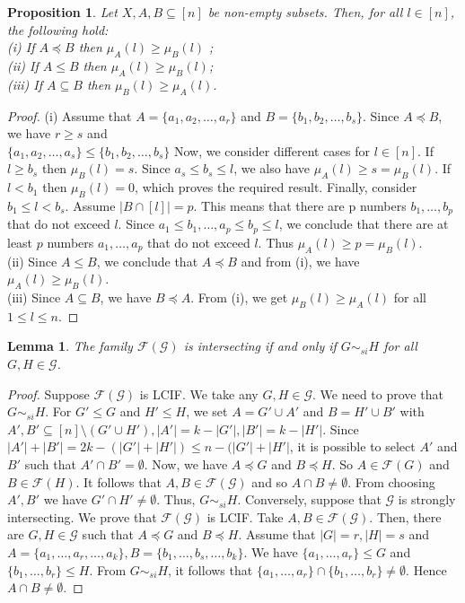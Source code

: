 \documentclass[reqno,english]{amsart}
\theoremstyle{plain}
\newtheorem{lem}[theorem]{Lemma}
\newtheorem{prop}[theorem]{Proposition}
\theoremstyle{remark}
\newcommand{\0}[0]{\emptyset}
\renewcommand{\1}[0]{\textbf{1}}
\theoremstyle{plain}
\theoremstyle{remark}
\renewcommand{\1}[0]{\textbf{1}}
\begin{document}
\begin{prop} Let $X,A,B \subseteq [n]$ be non-empty subsets. Then, for all $l \in [n]$, the following hold: \\
(i) If $A \preceq B$ then $\mu_{A} (l) \geq \mu_{B}(l)$ ;\\
(ii) If $A \leq B$ then $\mu_{A}(l) \geq \mu_{B}(l)$;\\
(iii) If $A \subseteq B $ then $\mu_{B}(l) \geq \mu_{A}(l)$.
\end{prop}
\begin{proof}
(i) Assume that $A=\{a_{1},a_{2},\ldots,a_{r}\}$ and $B=\{b_{1},b_{2},\ldots,b_{
s}\}$. Since $A \preceq B$, we have $r \geq s$ and\\ $\{a_{1},a_{2},\ldots,a_{s}\} \leq \{b_{1},b_{2},\ldots,b_{s}\}$
Now, we consider different cases for $l \in [n]$. If $l \geq b_{s} $ then $\mu_{B}(l)=s $. Since $a_{s} \leq b_{s} \leq l$, we also have $\mu_{A}(l) \geq s =\mu_{B}(l)$. If $l < b_{1}$ then $\mu_{B}(l) =0$, which proves the required result. Finally, consider $b_{1} \leq l < b_{s}$. Assume $|B \cap [l]|=p$. This means that there are p numbers $b_{1},\ldots,b_{p}$ that do not exceed $l$. Since $a_{1} \leq b_{1},\ldots,a_{p} \leq b_{p} \leq l$, we conclude that there are at least $p$ numbers $a_{1},\ldots,a_{p}$ that do not exceed $l$. Thus $\mu_{A}(l) \geq p =\mu_{B}(l)$.\\ 
(ii) Since  $A\leq B$, we conclude that $A \preceq B$ and from (i), we have $\mu_{A}(l) \geq \mu_{B}(l)$.\\
(iii) Since $A \subseteq B$, we have $B \preceq A$. From (i), we get $\mu_{B}(l) \geq \mu_{A}(l)$ for all $1 \leq l \leq n$.
\end{proof}
\begin{lem}\label{lem1} The family $\mathcal{F}(\mathcal{G})$ is intersecting if and only if $G \sim_{si} H $ for all $G,H \in \mathcal{G}$. 
\end{lem}
\begin{proof} Suppose $\mathcal{F}(\mathcal{G})$ is LCIF. We take any $G,H \in \mathcal{G}$. We need to prove that $G \sim_{si} H$. For $G' \leq G$ and $H' \leq H$, we set $A = G' \cup A'$ and $B=H' \cup B'$ with $A',B' \subseteq [n]\setminus (G' \cup H'), |A'|=k-|G'|, |B'|=k-|H'|$. Since $|A'|+|B'|=2k-(|G'|+|H'|) \leq n-(|G'|+|H'|$, it is possible to select $A'$ and $B'$
such that $A'\cap B'=\emptyset$. Now, we have $A \preceq G$ and $B \preceq H$. So $A \in \mathcal{F}(G)$ and $B \in \mathcal{F}(H)$. It follows that $A,B \in \mathcal{F}(\mathcal{G})$ and so $A \cap B \neq \emptyset$. From choosing $A',B'$ we have $G' \cap H' \neq \emptyset$. Thus, $G \sim_{si} H$. Conversely, suppose that $\mathcal{G}$ is strongly intersecting. We prove that $\mathcal{F}(\mathcal{G})$ is LCIF. Take $A,B \in \mathcal{F}(\mathcal{G})$. Then, there are $G,H \in \mathcal{G}$ such that $A \preceq G$ and $B \preceq H$. Assume that $|G|=r, |H|=s$ and $A=\{a_{1},\ldots,a_{r},\ldots,a_{k}\}, B=\{b_{1},\ldots,b_{s},\ldots,b_{k}\}$. We have $\{a_{1},\ldots,a_{r}\} \leq G$ and $\{b_{1},\ldots,b_{r}\} \leq H$. From $G \sim_{si} H$, it follows that $\{a_{1},\ldots,a_{r}\} \cap \{b_{1},\ldots,b_{r}\} \neq \emptyset$. Hence $A \cap B \neq \emptyset$.
\end{proof}
\end{document}
